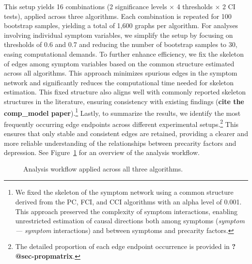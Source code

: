 \documentclass[
]{article}
\begin{document}
This setup yields 16 combinations (2 significance levels × 4 thresholds
× 2 CI tests), applied across three algorithms. Each combination is
repeated for 100 bootstrap samples, yielding a total of 1,600 graphs per
algorithm. For analyses involving individual symptom variables, we
simplify the setup by focusing on thresholds of 0.6 and 0.7 and reducing
the number of bootstrap samples to 30, easing computational demands. To
further enhance efficiency, we fix the skeleton of edges among symptom
variables based on the common structure estimated across all algorithms.
This approach minimizes spurious edges in the symptom network and
significantly reduces the computational time needed for skeleton
estimation. This fixed structure also aligns well with commonly reported
skeleton structures in the literature, ensuring consistency with
existing findings (\textbf{cite the comp\_model paper}).\footnote{We
  fixed the skeleton of the symptom network using a common structure
  derived from the PC, FCI, and CCI algorithms with an alpha level of
  0.001. This approach preserved the complexity of symptom interactions,
  enabling unrestricted estimation of causal directions both among
  symptoms (\emph{symptom --- symptom} interactions) and between
  symptoms and precarity factors.} Lastly, to summarize the results, we
identify the most frequently occurring edge endpoints across different
experimental setups.\footnote{The detailed proportion of each edge
  endpoint occurrence is provided in \textbf{?@sec-propmatrix}.} This
ensures that only stable and consistent edges are retained, providing a
clearer and more reliable understanding of the relationships between
precarity factors and depression. See Figure~\ref{fig-workflow} for an
overview of the analysis workflow.

\begin{figure}


\caption{\label{fig-workflow}Analysis workflow applied across all three
algorithms.}

\end{figure}%
\end{document}
